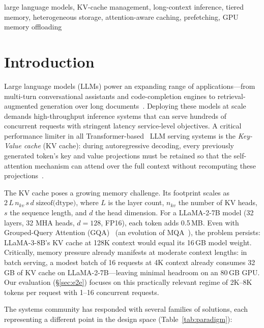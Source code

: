 \documentclass[conference]{IEEEtran}
\begin{document}
\begin{IEEEkeywords}
large language models, KV-cache management, long-context inference, tiered memory, heterogeneous storage, attention-aware caching, prefetching, GPU memory offloading
\end{IEEEkeywords}

\section{Introduction}

Large language models (LLMs) power an expanding range of applications---from multi-turn conversational assistants and code-completion engines to retrieval-augmented generation over long documents~\cite{gpt4,llama2,llama3}. Deploying these models at scale demands high-throughput inference systems that can serve hundreds of concurrent requests with stringent latency service-level objectives. A critical performance limiter in all Transformer-based~\cite{transformer} LLM serving systems is the \emph{Key-Value cache} (KV cache): during autoregressive decoding, every previously generated token's key and value projections must be retained so that the self-attention mechanism can attend over the full context without recomputing these projections~\cite{vllm}.

The KV cache poses a growing memory challenge. Its footprint scales as $2\,L\,n_{kv}\,s\,d\;\text{sizeof(dtype)}$, where $L$ is the layer count, $n_{kv}$ the number of KV heads, $s$ the sequence length, and $d$ the head dimension. For a LLaMA-2-7B model (32 layers, 32 MHA heads, $d{=}128$, FP16), each token adds 0.5\,MB. Even with Grouped-Query Attention (GQA)~\cite{gqa} (an evolution of MQA~\cite{mqa}), the problem persists: LLaMA-3-8B's KV cache at 128K context would equal its 16\,GB model weight. Critically, memory pressure already manifests at moderate context lengths: in batch serving, a modest batch of 16 requests at 4K context already consumes 32\,GB of KV cache on LLaMA-2-7B---leaving minimal headroom on an 80\,GB GPU. Our evaluation (\S\ref{sec:e2e}) focuses on this practically relevant regime of 2K--8K tokens per request with 1--16 concurrent requests.

The systems community has responded with several families of solutions, each representing a different point in the design space (Table~\ref{tab:paradigm}):
\end{document}
